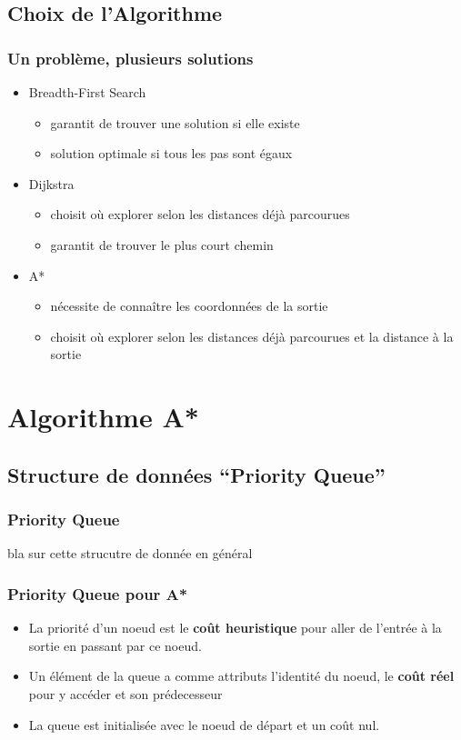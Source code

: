 \documentclass{beamer}
\begin{document}
\subsection{Choix de l'Algorithme}
\begin{frame}
  \frametitle{Un problème, plusieurs solutions}
  \begin{itemize}
  \item<1-> Breadth-First Search
    \begin{itemize}
    \item garantit de trouver une solution si elle existe
    \item solution optimale si tous les pas sont égaux
    \end{itemize}
  \item<2-> Dijkstra
    \begin{itemize}
    \item choisit où explorer selon les distances déjà parcourues
    \item garantit de trouver le plus court chemin
    \end{itemize}    
  \item<3-> A*
    \begin{itemize}
    \item nécessite de connaître les coordonnées de la sortie
    \item choisit où explorer selon les distances déjà parcourues et la distance
      à la sortie
    \end{itemize}
  \end{itemize}
\end{frame}

\section{Algorithme A*}
\subsection{Structure de données ``Priority Queue''}
\begin{frame}
  \frametitle{Priority Queue}
  bla sur cette strucutre de donnée en général
\end{frame}
\begin{frame}
  \frametitle{Priority Queue pour A*}
  \begin{itemize}
  \item<1-> La priorité d'un noeud est le \textbf{coût heuristique} pour aller de
    l'entrée à la sortie en passant par ce noeud.
  \item<2-> Un élément de la queue a comme attributs l'identité du noeud, le
    \textbf{coût réel} pour y accéder et son prédecesseur
  \item<3-> La queue est initialisée avec le noeud de départ et un coût nul.
  \end{itemize}
\end{frame}
\end{document}

